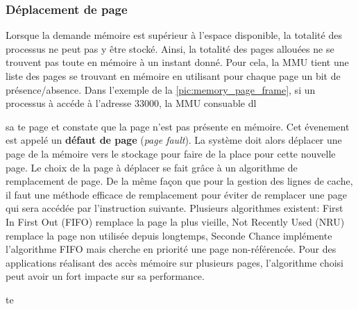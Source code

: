 \subsubsection{Déplacement de page} \label{sec:deplacement_page}
Lorsque la demande mémoire est supérieur à l'espace disponible, la totalité des processus ne peut pas y être stocké. Ainsi, la totalité des pages allouées ne se trouvent pas toute en mémoire à un instant donné. Pour cela, la MMU tient une liste des pages se trouvant en mémoire en utilisant pour chaque page un bit de présence/absence. Dans l'exemple de la \autoref{pic:memory_page_frame}, si un processus à accéde à l'adresse $33000$, la MMU consuable dl

 sa te page et constate que la page n'est pas présente en mémoire. Cet évenement est appelé un \textbf{défaut de page} (\textit{page fault}). La système doit alors déplacer une page de la mémoire vers le stockage pour faire de la place pour cette nouvelle page. Le choix de la page à déplacer se fait grâce à un algorithme de remplacement de page. De la même façon que pour la gestion des lignes de cache, il faut une méthode efficace de remplacement pour éviter de remplacer une page qui sera accédée par l'instruction suivante. Plusieurs algorithmes existent: First In First Out (FIFO) remplace la page la plus vieille, Not Recently Used (NRU) remplace la page non utilisée depuis longtemps, Seconde Chance implémente l'algorithme FIFO mais cherche en priorité une page non-référencée. Pour des applications réalisant des accès mémoire sur plusieurs pages, l'algorithme choisi peut avoir un fort impacte sur sa performance.


te